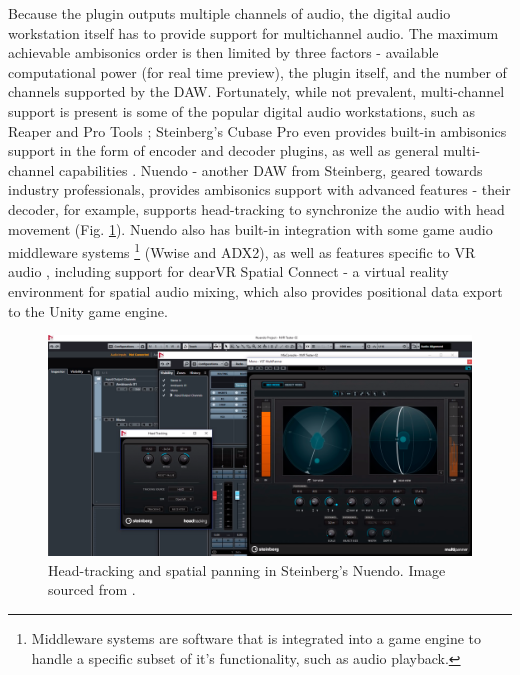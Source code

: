 Because the plugin outputs multiple channels of audio, 
the digital audio workstation itself has to provide support for multichannel audio.
The maximum achievable ambisonics order is then limited by three factors - 
available computational power (for real time preview), the plugin itself, and the number of channels supported by 
the DAW. Fortunately, while not prevalent, multi-channel support is present is some of the 
popular digital audio workstations, such as Reaper \cite{reaper_manual} and Pro Tools \cite{protools_manual}; 
Steinberg's Cubase Pro even provides built-in ambisonics support in the form of encoder and decoder plugins, as well as general multi-channel capabilities \cite{cubase_ambisonics}.
Nuendo - another DAW from Steinberg, geared towards industry professionals, provides ambisonics support with advanced features
- their decoder, for example, supports head-tracking to synchronize the audio with head movement (Fig. \ref{fig:nuendo_screenshot}). 
Nuendo also has built-in integration with some game audio middleware systems
\footnote{Middleware systems are software that is integrated into a game engine to handle a specific subset of it's functionality, such as audio playback.}
(Wwise and ADX2), as well as features specific to VR audio
, including support for dearVR Spatial Connect - a virtual reality environment for spatial audio mixing,
which also provides positional data export to the Unity game engine.
\cite{nuendo_features}

\begin{figure}[!ht]
    \centering
    \includegraphics[width=\textwidth]{images/existing_solutions/nuendo_panner_and_head_tracking.png}       
    \caption{Head-tracking and spatial panning in Steinberg's Nuendo.
        Image sourced from \cite{nuendo_screenshot}.
        \label{fig:nuendo_screenshot}}
\end{figure}

